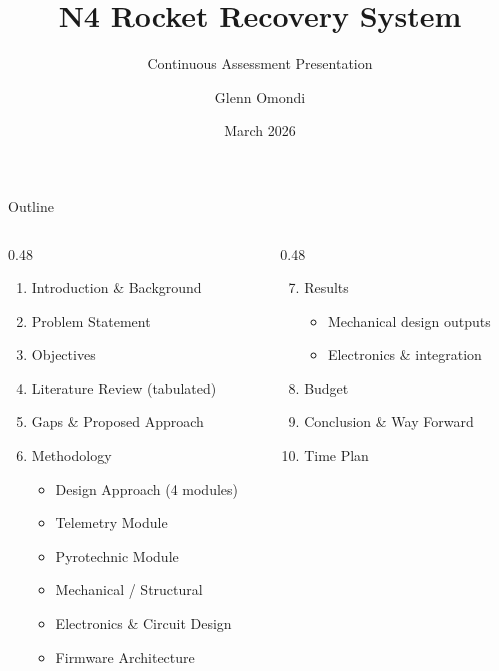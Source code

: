 \documentclass[aspectratio=169, 11pt]{beamer}
\title{N4 Rocket Recovery System}
\subtitle{Continuous Assessment Presentation}
\author{Glenn Omondi}
\institute{Nakuja Project --- Final Year Project}
\date{March 2026}
\begin{document}
\begin{frame}[plain]
\maketitle
\end{frame}

\begin{frame}{Outline}
\begin{columns}[T]
  \begin{column}{0.48\textwidth}
    \begin{enumerate}
      \item Introduction \& Background
      \item Problem Statement
      \item Objectives
      \item Literature Review (tabulated)
      \item Gaps \& Proposed Approach
      \item Methodology
        \begin{itemize}\small
          \item Design Approach (4 modules)
          \item Telemetry Module
          \item Pyrotechnic Module
          \item Mechanical / Structural
          \item Electronics \& Circuit Design
          \item Firmware Architecture
        \end{itemize}
    \end{enumerate}
  \end{column}
  \begin{column}{0.48\textwidth}
    \begin{enumerate}\setcounter{enumi}{6}
      \item Results
        \begin{itemize}\small
          \item Mechanical design outputs
          \item Electronics \& integration
        \end{itemize}
      \item Budget
      \item Conclusion \& Way Forward
      \item Time Plan
    \end{enumerate}
  \end{column}
\end{columns}
\end{frame}
\end{document}

